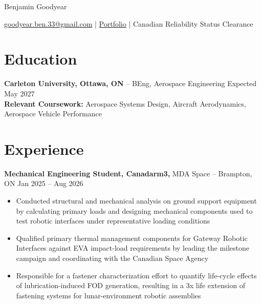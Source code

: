 \documentclass[11pt]{article}       %
\newcommand{\ph}[1]{{\color{red}[#1]}}
\begin{document}
 
\centerline{\Huge Benjamin Goodyear}
 
\vspace{5pt}
 
\centerline{\href{mailto:goodyear.ben.33@gmail.com}{goodyear.ben.33@gmail.com} | \href{https://goodyear33.github.io/}{Portfolio} | Canadian Reliability Status Clearance}
 
\vspace{-10pt}

\section*{Education}
\textbf{Carleton University, Ottawa, ON} -- BEng, Aerospace Engineering 
\hfill Expected May 2027 \\
\textbf{Relevant Coursework:} Aerospace Systems Design, Aircraft Aerodynamics, Aerospace Vehicle Performance 
 
\vspace{-6.5pt}
 
\section*{Experience}
\textbf{Mechanical Engineering Student, Canadarm3,} MDA Space -- Brampton, ON \hfill Jan 2025 -- Aug 2026 \\
\vspace{-9pt}
\begin{itemize}
  \item Conducted structural and mechanical analysis on ground support equipment by calculating primary loads and designing mechanical components used to test robotic interfaces under representative loading conditions
  \item Qualified  primary thermal management components for Gateway Robotic Interfaces against EVA impact-load requirements by leading the milestone campaign and coordinating with the Canadian Space Agency
  \item Responsible for a fastener characterization effort to quantify life-cycle effects of lubrication-induced FOD generation, resulting in a 3x life extension of fastening systems for lunar-environment robotic assemblies
\end{itemize}
 
\end{document}
